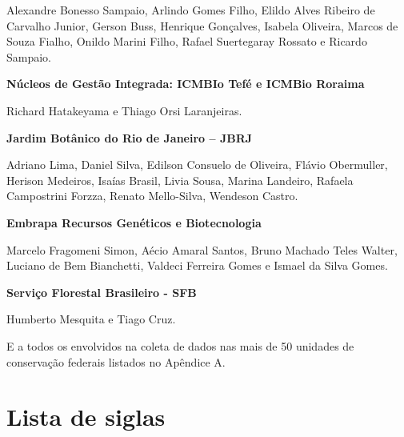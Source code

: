 \documentclass[
  letterpaper,
]{scrbook}
\begin{document}
Alexandre Bonesso Sampaio, Arlindo Gomes Filho, Elildo Alves Ribeiro de
Carvalho Junior, Gerson Buss, Henrique Gonçalves, Isabela Oliveira,
Marcos de Souza Fialho, Onildo Marini Filho, Rafael Suertegaray Rossato
e Ricardo Sampaio.

\textbf{Núcleos de Gestão Integrada: ICMBIo Tefé e ICMBio Roraima}

Richard Hatakeyama e Thiago Orsi Laranjeiras.

\textbf{Jardim Botânico do Rio de Janeiro -- JBRJ}

Adriano Lima, Daniel Silva, Edilson Consuelo de Oliveira, Flávio
Obermuller, Herison Medeiros, Isaías Brasil, Livia Sousa, Marina
Landeiro, Rafaela Campostrini Forzza, Renato Mello-Silva, Wendeson
Castro.

\textbf{Embrapa Recursos Genéticos e Biotecnologia}

Marcelo Fragomeni Simon, Aécio Amaral Santos, Bruno Machado Teles
Walter, Luciano de Bem Bianchetti, Valdeci Ferreira Gomes e Ismael da
Silva Gomes.

\textbf{Serviço Florestal Brasileiro - SFB}

Humberto Mesquita e Tiago Cruz.

E a todos os envolvidos na coleta de dados nas mais de 50 unidades de
conservação federais listados no Apêndice A.


\chapter*{Lista de siglas}\label{lista}


\captionsetup{labelsep=none}
\end{document}
